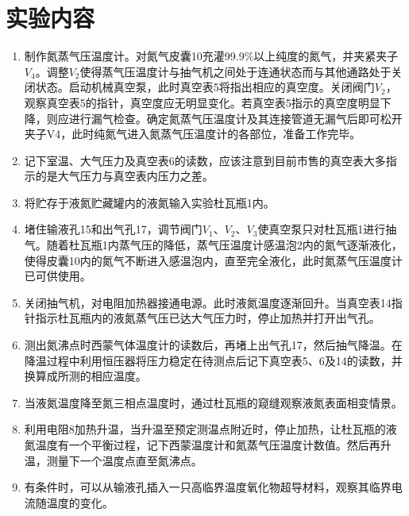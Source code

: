 \documentclass[a4paper]{article}
\begin{document}
\section{实验内容}
\begin{enumerate}
\item 制作氮蒸气压温度计。对氮气皮囊10充灌99.9\%以上纯度的氮气，并夹紧夹子$V_4$。调整$V_2$使得蒸气压温度计与抽气机之间处于连通状态而与其他通路处于关闭状态。启动机械真空泵，此时真空表5将指出相应的真空度。关闭阀门$V_2$，观察真空表5的指针，真空度应无明显变化。若真空表5指示的真空度明显下降，则应进行漏气检查。确定氮蒸气压温度计及其连接管道无漏气后即可松开夹子V4，此时纯氮气进入氮蒸气压温度计的各部位，准备工作完毕。
\item 记下室温、大气压力及真空表6的读数，应该注意到目前市售的真空表大多指示的是大气压力与真空表内压力之差。
\item 将贮存于液氮贮藏罐内的液氮输入实验杜瓦瓶1内。
\item 堵住输液孔15和出气孔17，调节阀门$V_1$、$V_2$、$V_3$使真空泵只对杜瓦瓶1进行抽气。随着杜瓦瓶1内蒸气压的降低，蒸气压温度计感温泡2内的氮气逐渐液化，使得皮囊10内的氮气不断进入感温泡内，直至完全液化，此时氮蒸气压温度计已可供使用。
\item 关闭抽气机，对电阻加热器接通电源。此时液氮温度逐渐回升。当真空表14指针指示杜瓦瓶内的液氮蒸气压已达大气压力时，停止加热并打开出气孔。
\item 测出氮沸点时西蒙气体温度计的读数后，再堵上出气孔17，然后抽气降温。在降温过程中利用恒压器将压力稳定在待测点后记下真空表5、6及14的读数，并换算成所测的相应温度。
\item 当液氮温度降至氮三相点温度时，通过杜瓦瓶的窥缝观察液氮表面相变情景。
\item 利用电阻8加热升温，当升温至预定测温点附近时，停止加热，让杜瓦瓶的液氮温度有一个平衡过程，记下西蒙温度计和氮蒸气压温度计数值。然后再升温，测量下一个温度点直至氮沸点。
\item 有条件时，可以从输液孔插入一只高临界温度氧化物超导材料，观察其临界电流随温度的变化。
\end{enumerate}
\end{document}
